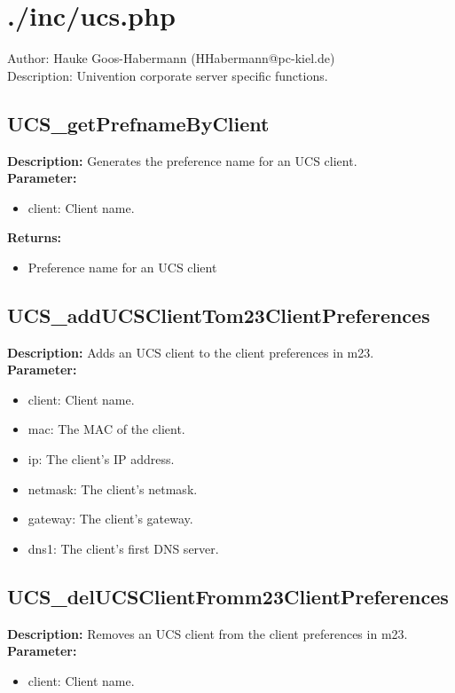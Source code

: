 \newpage\section{./inc/ucs.php}
 Author: Hauke Goos-Habermann (HHabermann@pc-kiel.de)\\
 Description: Univention corporate server specific functions.\\

\subsection{UCS\_getPrefnameByClient}
\textbf{Description:} Generates the preference name for an UCS client.\\
\textbf{Parameter:}
\begin{itemize}
\item client: Client name.
\end{itemize}
\textbf{Returns:}
\begin{itemize}
\item Preference name for an UCS client
\end{itemize}

\subsection{UCS\_addUCSClientTom23ClientPreferences}
\textbf{Description:} Adds an UCS client to the client preferences in m23.\\
\textbf{Parameter:}
\begin{itemize}
\item client: Client name.
\item mac: The MAC of the client.
\item ip: The client's IP address.
\item netmask: The client's netmask.
\item gateway: The client's gateway.
\item dns1: The client's first DNS server.
\end{itemize}

\subsection{UCS\_delUCSClientFromm23ClientPreferences}
\textbf{Description:} Removes an UCS client from the client preferences in m23.\\
\textbf{Parameter:}
\begin{itemize}
\item client: Client name.
\end{itemize}

